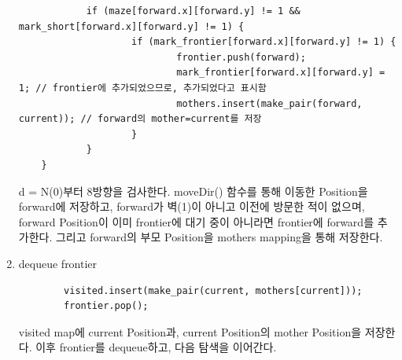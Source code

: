 \documentclass{article}
\begin{document}
\begin{enumerate}
\begin{verbatim}
    		if (maze[forward.x][forward.y] != 1 && mark_short[forward.x][forward.y] != 1) {
    				if (mark_frontier[forward.x][forward.y] != 1) {
        					frontier.push(forward);
        					mark_frontier[forward.x][forward.y] = 1; // frontier에 추가되었으므로, 추가되었다고 표시함
        					mothers.insert(make_pair(forward, current)); // forward의 mother=current를 저장
    				}
    		}
    }
    \end{verbatim}
    d = N(0)부터 8방향을 검사한다. moveDir() 함수를 통해 이동한 Position을 forward에 저장하고, forward가 벽(1)이 아니고 이전에 방문한 적이 없으며, forward Position이 이미 frontier에 대기 중이 아니라면 frontier에 forward를 추가한다. 그리고 forward의 부모 Position을 mothers mapping을 통해 저장한다.
    \item dequeue frontier
    \begin{verbatim}
		visited.insert(make_pair(current, mothers[current]));
		frontier.pop();
    \end{verbatim}
    visited map에 current Position과, current Position의 mother Position을 저장한다. 이후 frontier를 dequeue하고, 다음 탐색을 이어간다.
\end{enumerate}
\end{document}
